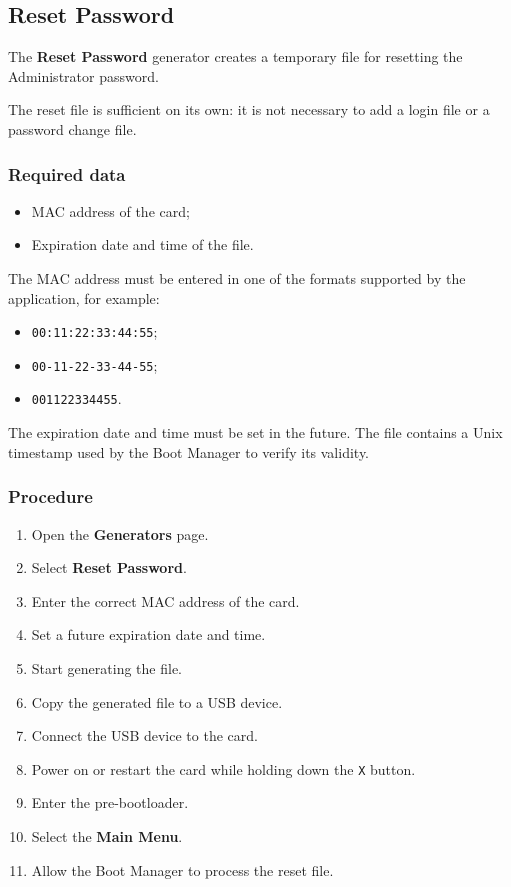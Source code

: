 ﻿\documentclass[11pt,a4paper]{article}
\newcommand{\button}[1]{\textbf{#1}}
\begin{document}
\subsection{Reset Password}

The \button{Reset Password} generator creates a temporary file
for resetting the Administrator password.

The reset file is sufficient on its own: it is not necessary to add
a login file or a password change file.

\subsubsection*{Required data}

\begin{itemize}
    \item MAC address of the card;
    \item Expiration date and time of the file.
\end{itemize}

The MAC address must be entered in one of the formats supported
by the application, for example:

\begin{itemize}
    \item \texttt{00:11:22:33:44:55};
    \item \texttt{00-11-22-33-44-55};
    \item \texttt{001122334455}.
\end{itemize}

The expiration date and time must be set in the future. The file
contains a Unix timestamp used by the Boot Manager to verify
its validity.

\subsubsection*{Procedure}

\begin{enumerate}
    \item Open the \button{Generators} page.
    \item Select \button{Reset Password}.
    \item Enter the correct MAC address of the card.
    \item Set a future expiration date and time.
    \item Start generating the file.
    \item Copy the generated file to a USB device.
    \item Connect the USB device to the card.
    \item Power on or restart the card while holding down
    the \texttt{X} button.
    \item Enter the pre-bootloader.
    \item Select the \textbf{Main Menu}.
    \item Allow the Boot Manager to process the reset file.
\end{enumerate}
\end{document}

